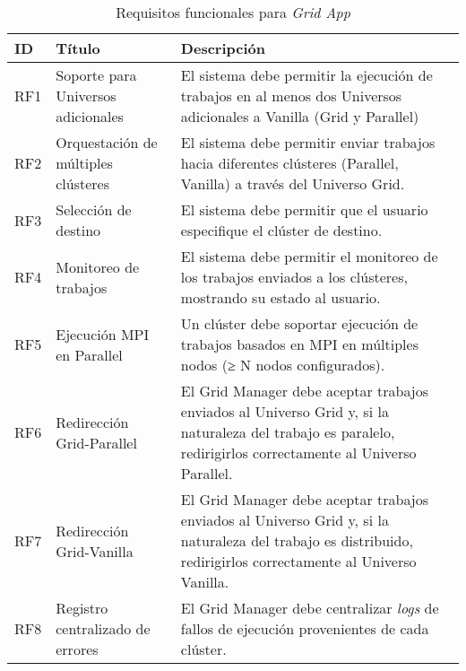 \begin{table}[H]
	\centering
	\sffamily\scriptsize
	\setlength{\tabcolsep}{4pt}
	\renewcommand{\arraystretch}{1.3}
	\caption{Requisitos funcionales para \textit{Grid App}}
	\label{table:requisitosFuncionales}
	\begin{tabular}{|p{}|p{}|p{}|}
		\toprule
		\textbf{ID}                              & \textbf{Título}                               & \textbf{Descripción} \\
		\midrule
		RF1 & Soporte para Universos adicionales & El sistema debe permitir la ejecución de trabajos en al menos dos Universos adicionales a Vanilla (Grid y Parallel) \\
		\midrule
		RF2 & Orquestación de múltiples clústeres & El sistema debe permitir enviar trabajos hacia diferentes clústeres (Parallel, Vanilla) a través del Universo Grid. \\
		\midrule
		RF3 & Selección de destino & El sistema debe permitir que el usuario especifique el clúster de destino. \\
		\midrule
		RF4 & Monitoreo de trabajos & El sistema debe permitir el monitoreo de los trabajos enviados a los clústeres, mostrando su estado al usuario. \\
		\midrule
		RF5 & Ejecución MPI en Parallel & Un clúster debe soportar ejecución de trabajos basados en MPI en múltiples nodos (≥ N nodos configurados). \\
		\midrule
		RF6 & Redirección Grid-Parallel & El Grid Manager debe aceptar trabajos enviados al Universo Grid y, si la naturaleza del trabajo es paralelo, redirigirlos correctamente al Universo Parallel. \\
        \midrule
		RF7 & Redirección Grid-Vanilla & El Grid Manager debe aceptar trabajos enviados al Universo Grid y, si la naturaleza del trabajo es distribuido, redirigirlos correctamente al Universo Vanilla. \\
        \midrule
		RF8 & Registro centralizado de errores & El Grid Manager debe centralizar \textit{logs} de fallos de ejecución provenientes de cada clúster. \\
		\bottomrule
	\end{tabular}
\end{table}